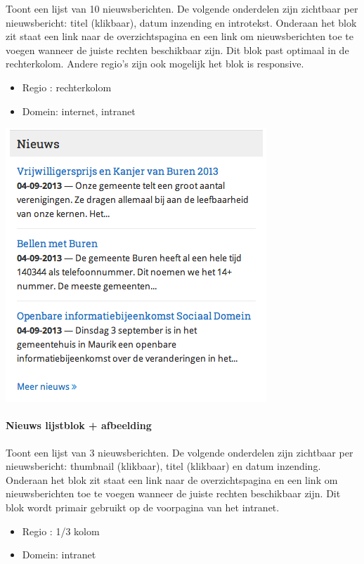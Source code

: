 Toont een lijst van 10 nieuwsberichten. De volgende onderdelen zijn zichtbaar per nieuwsbericht: titel (klikbaar), datum inzending en introtekst. Onderaan het blok zit staat een link naar de overzichtspagina en een link om nieuwsberichten toe te voegen wanneer de juiste rechten beschikbaar zijn. Dit blok past optimaal in de rechterkolom. Andere regio's zijn ook mogelijk het blok is responsive.

\begin{itemize}
\item Regio : rechterkolom
\item Domein: internet, intranet
\end{itemize}

\begin{center}
	\includegraphics[scale=0.5]{img/blokken/nieuwslist.png}
\end{center}

\paragraph{Nieuws lijstblok + afbeelding}

Toont een lijst van 3 nieuwsberichten. De volgende onderdelen zijn zichtbaar per nieuwsbericht: thumbnail (klikbaar), titel (klikbaar) en datum inzending. Onderaan het blok zit staat een link naar de overzichtspagina en een link om nieuwsberichten toe te voegen wanneer de juiste rechten beschikbaar zijn. Dit blok wordt primair gebruikt op de voorpagina van het intranet.

\begin{itemize}
\item Regio : 1/3 kolom
\item Domein: intranet
\end{itemize}

